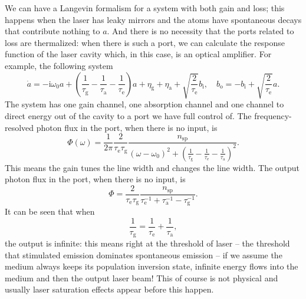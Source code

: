 \documentclass[hyperref, a4paper]{article}
\newcommand*{\ii}{\mathrm{i}}
\newcommand*{\bi}{b_{\text{i}}}
\newcommand*{\bo}{b_{\text{o}}}
\newcommand*{\taue}{\tau_{\text{e}}}
\newcommand*{\taug}{\tau_{\text{g}}}
\begin{document}
We can have a Langevin formalism for a system with both gain and loss;
this happens when the laser has leaky mirrors 
and the atoms have spontaneous decays that contribute nothing to $a$.
And there is no necessity that the ports related to loss are thermalized:
when there is such a port, we can calculate the response function of the laser cavity 
which, in this case, is an optical amplifier.
For example, the following system  
\begin{equation}
    \dot{a} = - \ii \omega_0 a + \left( \frac{1}{\taug} - \frac{1}{\tau_{\text{a}}} - \frac{1}{\tau_{\text{e}}} \right) a + \eta_{\text{g}} + \eta_{\text{a}} + \sqrt{\frac{2}{\tau_{\text{e}}}} \bi, \quad 
    \bo = - \bi + \sqrt{\frac{2}{\tau_{\text{e}}}} a.
\end{equation}
The system has one gain channel, one absorption channel 
and one channel to direct energy out of the cavity to a port we have full control of.
The frequency-resolved photon flux in the port, when there is no input, is 
\begin{equation}
    \Phi(\omega) = \frac{1}{2\pi} \frac{2}{\tau_{\text{e}} \tau_{\text{g}}} \frac{n_{\text{sp}}}{(\omega - \omega_0)^2 + \left(  \frac{1}{\taug} - \frac{1}{\taue} - \frac{1}{\tau_{\text{a}}} \right)^2 }.
\end{equation}
This means the gain tunes the line width and changes the line width.
The output photon flux in the port, when there is no input, is  
\begin{equation}
    \Phi = \frac{2}{\tau_{\text{e}} \tau_{\text{g}}} \frac{n_{\text{sp}}}{\tau_\text{e}^{-1} + \tau_{\text{a}}^{-1} - \tau_{\text{g}}^{-1}}.
\end{equation}
It can be seen that when 
\begin{equation}
    \frac{1}{\taug} = \frac{1}{\taue} + \frac{1}{\tau_{\text{a}}},
\end{equation}
the output is infinite: this means right at the threshold of laser --
the threshold that stimulated emission dominates spontaneous emission -- 
if we assume the medium always keeps its population inversion state,
infinite energy flows into the medium and then the output laser beam!
This of course is not physical and usually laser saturation effects appear before this happen. 
\end{document}
